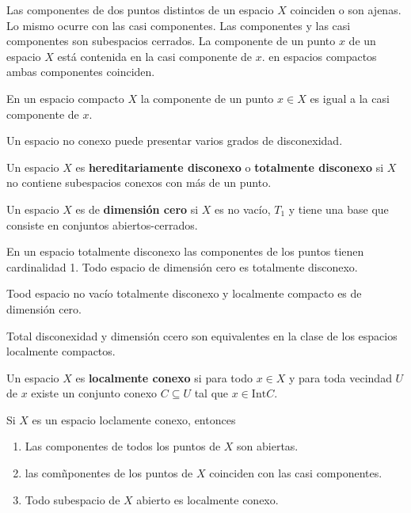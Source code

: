 \documentclass[12pt]{report}
\theoremstyle{largebreak}
\newcommand{\Int}[1]{\text{Int}\ensuremath{#1}}
\begin{document}
    \begin{obs}
        Las componentes de dos puntos distintos de un espacio $X$ coinciden o son ajenas. Lo mismo ocurre con las casi componentes. Las componentes y las casi componentes son subespacios cerrados. La componente de un punto $x$ de un espacio $X$ está contenida en la casi componente de $x$. en espacios compactos ambas componentes coinciden.
    \end{obs}

    \begin{theor}
        En un espacio compacto $X$ la componente de un punto $x\in X$ es igual a la casi componente de $x$.
    \end{theor}

    Un espacio no conexo puede presentar varios grados de disconexidad.

    \begin{mydef}
        Un espacio $X$ es \textbf{hereditariamente disconexo} o \textbf{totalmente disconexo} si $X$ no contiene subespacios conexos con más de un punto.

        Un espacio $X$ es de \textbf{dimensión cero} si $X$ es no vacío, $T_1$ y tiene una base que consiste en conjuntos abiertos-cerrados.
    \end{mydef}

    \begin{obs}
        En un espacio totalmente disconexo las componentes de los puntos tienen cardinalidad 1. Todo espacio de dimensión cero es totalmente disconexo.
    \end{obs}

    \begin{theor}
        Tood espacio no vacío totalmente disconexo y localmente compacto es de dimensión cero.

        Total disconexidad y dimensión ccero son equivalentes en la clase de los espacios localmente compactos.
    \end{theor}

    \begin{mydef}
        Un espacio $X$ es \textbf{localmente conexo} si para todo $x\in X$ y para toda vecindad $U$ de $x$ existe un conjunto conexo $C\subseteq U$ tal que $x\in\Int{C}$.
    \end{mydef}

    \begin{theor}
        Si $X$ es un espacio loclamente conexo, entonces
        \begin{enumerate}
            \item Las componentes de todos los puntos de $X$ son abiertas.
            \item las comñponentes de los puntos de $X$ coinciden con las casi componentes.
            \item Todo subespacio de $X$ abierto es localmente conexo.
        \end{enumerate}
    \end{theor}
\end{document}
